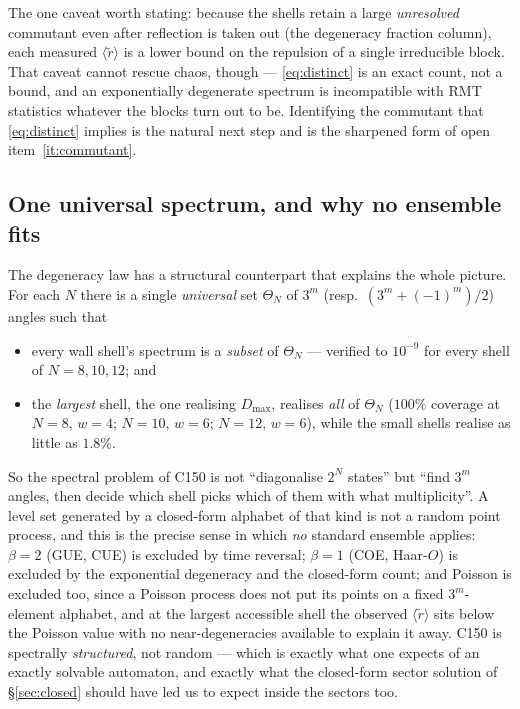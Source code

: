 \documentclass[11pt]{article}
\theoremstyle{plain}
\theoremstyle{definition}
\begin{document}
The one caveat worth stating: because the shells retain a large \emph{unresolved}
commutant even after reflection is taken out (the degeneracy fraction column),
each measured $\langle\tilde r\rangle$ is a lower bound on the repulsion of a
single irreducible block. That caveat cannot rescue chaos, though ---
\eqref{eq:distinct} is an exact count, not a bound, and an exponentially
degenerate spectrum is incompatible with RMT statistics whatever the blocks turn
out to be. Identifying the commutant that \eqref{eq:distinct} implies is the
natural next step and is the sharpened form of open item~\ref{it:commutant}.

\subsection{One universal spectrum, and why no ensemble fits}
\label{sec:universal}

The degeneracy law has a structural counterpart that explains the whole picture.
For each $N$ there is a single \emph{universal} set $\Theta_N$ of
$3^{m}$ (resp.\ $(3^m+(-1)^m)/2$) angles such that

\begin{itemize}
\item every wall shell's spectrum is a \emph{subset} of $\Theta_N$ --- verified to
  $10^{-9}$ for every shell of $N=8,10,12$; and
\item the \emph{largest} shell, the one realising $D_{\max}$, realises
  \emph{all} of $\Theta_N$ ($100\%$ coverage at $N=8$, $w=4$; $N=10$, $w=6$;
  $N=12$, $w=6$), while the small shells realise as little as $1.8\%$.
\end{itemize}

So the spectral problem of C150 is not ``diagonalise $2^N$ states'' but ``find
$3^{m}$ angles, then decide which shell picks which of them with what
multiplicity''. A level set generated by a closed-form alphabet of that kind is
not a random point process, and this is the precise sense in which \emph{no}
standard ensemble applies: $\beta=2$ (GUE, CUE) is excluded by time reversal;
$\beta=1$ (COE, Haar-$O$) is excluded by the exponential degeneracy and the
closed-form count; and Poisson is excluded too, since a Poisson process does not
put its points on a fixed $3^m$-element alphabet, and at the largest accessible
shell the observed $\langle\tilde r\rangle$ sits below the Poisson value with no
near-degeneracies available to explain it away. C150 is spectrally
\emph{structured}, not random --- which is exactly what one expects of an
exactly solvable automaton, and exactly what the closed-form sector solution of
\S\ref{sec:closed} should have led us to expect inside the sectors too.
\end{document}
